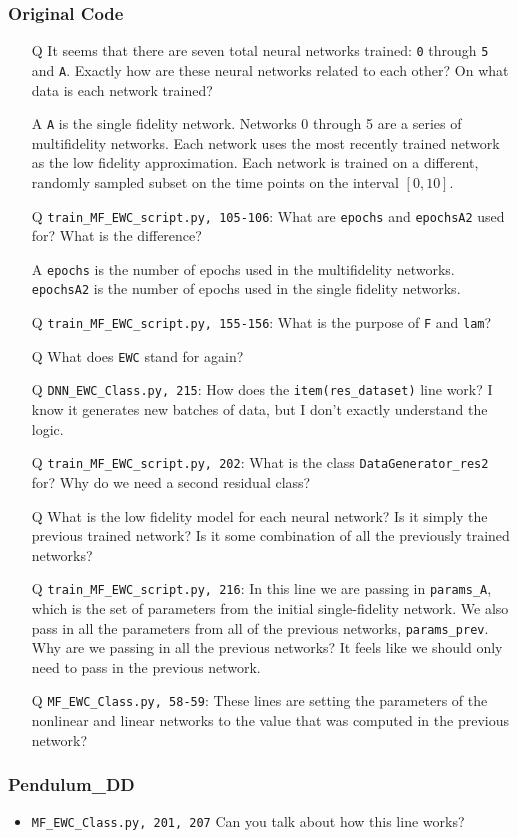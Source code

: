 \documentclass{article}
\begin{document}
\subsubsection*{Original Code}
\begin{itemize}
	\item[Q] It seems that there are seven total neural networks trained: \verb|0| through \verb|5| and \verb|A|. Exactly how are these neural networks related to each other? On what data is each network trained?
	\item[A] \verb|A| is the single fidelity network. Networks 0 through 5 are a series of multifidelity networks. Each network uses the most recently trained network as the low fidelity approximation. Each network is trained on a different, randomly sampled subset on the time points on the interval $[0,10]$. 
	\item[Q] \verb|train_MF_EWC_script.py, 105-106|: What are \verb|epochs| and \verb|epochsA2| used for? What is the difference?
	\item[A] \verb|epochs| is the number of epochs used in the multifidelity networks. \verb|epochsA2| is the number of epochs used in the single fidelity networks.
	\item[Q] \verb|train_MF_EWC_script.py, 155-156|: What is the purpose of \verb|F| and \verb|lam|?
	\item[Q] What does \verb|EWC| stand for again?
	\item[Q] \verb|DNN_EWC_Class.py, 215|: How does the \verb|item(res_dataset)| line work? I know it generates new batches of data, but I don't exactly understand the logic.
	\item[Q] \verb|train_MF_EWC_script.py, 202|: What is the class \verb|DataGenerator_res2| for? Why do we need a second residual class?
	\item[Q] What is the low fidelity model for each neural network? Is it simply the previous trained network? Is it some combination of all the previously trained networks?
	\item[Q] \verb|train_MF_EWC_script.py, 216|: In this line we are passing in \verb|params_A|, which is the set of parameters from the initial single-fidelity network. We also pass in all the parameters from all of the previous networks, \verb|params_prev|. Why are we passing in all the previous networks? It feels like we should only need to pass in the previous network.
	\item[Q] \verb|MF_EWC_Class.py, 58-59|: These lines are setting the parameters of the nonlinear and linear networks to the value that was computed in the previous network?
\end{itemize}
\subsubsection*{Pendulum\_DD}
\begin{itemize}
	\item \verb|MF_EWC_Class.py, 201, 207| Can you talk about how this line works?
\end{itemize}
\end{document}
